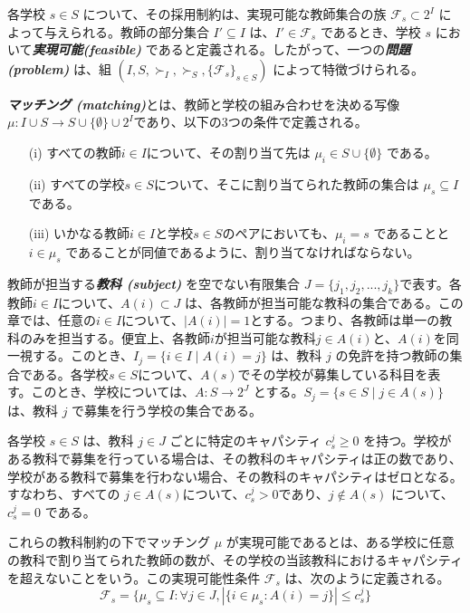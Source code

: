 \documentclass[12pt, a4paper]{article}
\theoremstyle{definition}
\theoremstyle{remark}
\theoremstyle{plain}
\begin{document}
各学校 $s \in S$ について、その採用制約は、実現可能な教師集合の族 $\mathcal{F}_s \subset 2^{I}$ によって与えられる。教師の部分集合 $I' \subseteq I$ は、$I' \in \mathcal{F}_s$ であるとき、学校 $s$ において\textbf{\textit{実現可能(feasible) }} であると定義される。したがって、一つの\textbf{\textit{問題(problem) }} は、組 $(I, S, \succ_I, \succ_S, \{\mathcal{F}_s\}_{s \in S})$ によって特徴づけられる。

\textbf{\textit{マッチング (matching)}}とは、教師と学校の組み合わせを決める写像$ \mu : I \cup S \to S \cup \{\emptyset\} \cup 2^{I}$であり、以下の3つの条件で定義される。
\begin{itemize}
    \item[(i)] すべての教師$i \in I$について、その割り当て先は $\mu_i \in S \cup \{\emptyset\}$ である。
    \item[(ii)] すべての学校$s \in S$について、そこに割り当てられた教師の集合は $\mu_s \subseteq I$ である。
    \item[(iii)] いかなる教師$i \in I$と学校$s \in S$のペアにおいても、$\mu_i = s$ であることと $i \in \mu_s$ であることが同値であるように、割り当てなければならない。
\end{itemize}



教師が担当する\textbf{\textit{教科 (subject) }}を空でない有限集合 $J = \{j_1, j_2, ..., j_k\}$で表す。各教師$i \in I$について、$A(i) \subset J$ は、各教師が担当可能な教科の集合である。この章では、任意の$i \in I$について、$|A(i)| = 1$とする。つまり、各教師は単一の教科のみを担当する。便宜上、各教師$i$が担当可能な教科$j \in A(i)$と、$A(i)$を同一視する。このとき、$I_j = \{i \in I \mid A(i) = j\}$ は、教科 $j$ の免許を持つ教師の集合である。各学校$s \in S$について、$A(s)$でその学校が募集している科目を表す。このとき、学校については、$A: S \to 2^J$ とする。$S_j = \{s \in S \mid j \in A(s)\}$ は、教科 $j$ で募集を行う学校の集合である。

各学校 $s \in S$ は、教科 $j \in J$ ごとに特定のキャパシティ $c^j_s \geq 0$ を持つ。学校がある教科で募集を行っている場合は、その教科のキャパシティは正の数であり、学校がある教科で募集を行わない場合、その教科のキャパシティはゼロとなる。すなわち、すべての $j \in A(s)$について、$c^j_s > 0$であり、$j \notin A(s)$ について、$c^j_s = 0$ である。

これらの教科制約の下でマッチング $\mu$ が実現可能であるとは、ある学校に任意の教科で割り当てられた教師の数が、その学校の当該教科におけるキャパシティを超えないことをいう。この実現可能性条件 $\mathcal{F}_s$ は、次のように定義される。
\[
\mathcal{F}_s = \{\mu_s \subseteq I : \forall j \in J, |\{i \in \mu_s : A(i) = j \}| \leq c^j_s \}
\]
\end{document}
